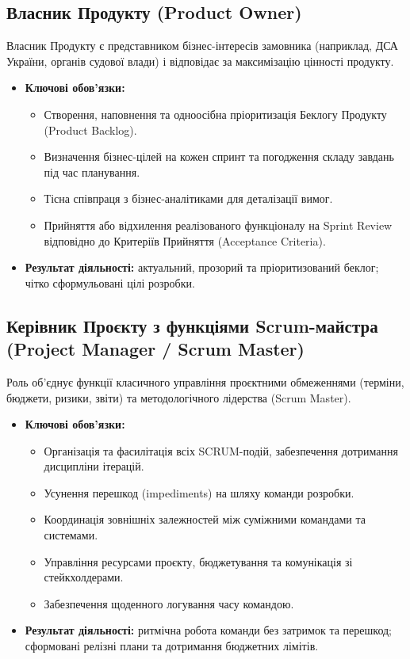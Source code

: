 \documentclass{article}
\begin{document}
\subsection{Власник Продукту (Product Owner)}
Власник Продукту є представником бізнес-інтересів замовника (наприклад, ДСА України, органів судової влади) і відповідає за максимізацію цінності продукту.
\begin{itemize}
    \item \textbf{Ключові обов'язки:}
    \begin{itemize}
        \item Створення, наповнення та одноосібна пріоритизація Беклогу Продукту (Product Backlog).
        \item Визначення бізнес-цілей на кожен спринт та погодження складу завдань під час планування.
        \item Тісна співпраця з бізнес-аналітиками для деталізації вимог.
        \item Прийняття або відхилення реалізованого функціоналу на Sprint Review відповідно до Критеріїв Прийняття (Acceptance Criteria).
    \end{itemize}
    \item \textbf{Результат діяльності:} актуальний, прозорий та пріоритизований беклог; чітко сформульовані цілі розробки.
\end{itemize}

\subsection{Керівник Проєкту з функціями Scrum-майстра (Project Manager / Scrum Master)}
Роль об'єднує функції класичного управління проєктними обмеженнями (терміни, бюджети, ризики, звіти) та методологічного лідерства (Scrum Master).
\begin{itemize}
    \item \textbf{Ключові обов'язки:}
    \begin{itemize}
        \item Організація та фасилітація всіх SCRUM-подій, забезпечення дотримання дисципліни ітерацій.
        \item Усунення перешкод (impediments) на шляху команди розробки.
        \item Координація зовнішніх залежностей між суміжними командами та системами.
        \item Управління ресурсами проєкту, бюджетування та комунікація зі стейкхолдерами.
        \item Забезпечення щоденного логування часу командою.
    \end{itemize}
    \item \textbf{Результат діяльності:} ритмічна робота команди без затримок та перешкод; сформовані релізні плани та дотримання бюджетних лімітів.
\end{itemize}
\end{document}

